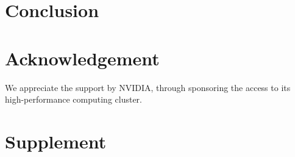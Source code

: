 \documentclass[5p, twocolumn, times, sort&compress]{elsarticle}
\begin{document}
    \section{Conclusion}
    

    \section*{Acknowledgement}
    We appreciate the support by NVIDIA, through sponsoring the access to its high-performance computing cluster.

    

    \appendix
    \section{Supplement}
    
\end{document}
